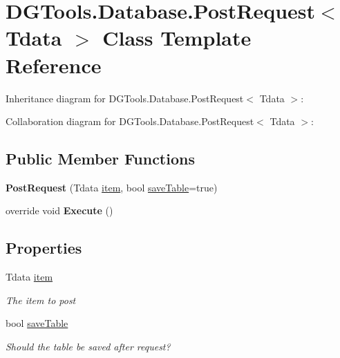 \hypertarget{class_d_g_tools_1_1_database_1_1_post_request}{}\section{D\+G\+Tools.\+Database.\+Post\+Request$<$ Tdata $>$ Class Template Reference}
\label{class_d_g_tools_1_1_database_1_1_post_request}


Inheritance diagram for D\+G\+Tools.\+Database.\+Post\+Request$<$ Tdata $>$\+:


Collaboration diagram for D\+G\+Tools.\+Database.\+Post\+Request$<$ Tdata $>$\+:
\subsection*{Public Member Functions}
\begin{DoxyCompactItemize}
\item 
\mbox{\label{class_d_g_tools_1_1_database_1_1_post_request_a7f39ebff96457a82925095d55cb037fe}} 
{\bfseries Post\+Request} (Tdata \mbox{\hyperlink{class_d_g_tools_1_1_database_1_1_post_request_a448a29ab2dfd1c7782a20dfb7a176ba0}{item}}, bool \mbox{\hyperlink{class_d_g_tools_1_1_database_1_1_post_request_a3e1f964184fd236c45e10e141f14d3e1}{save\+Table}}=true)
\item 
\mbox{\label{class_d_g_tools_1_1_database_1_1_post_request_add637337a86546344a9021c8ea50a8ff}} 
override void {\bfseries Execute} ()
\end{DoxyCompactItemize}
\subsection*{Properties}
\begin{DoxyCompactItemize}
\item 
Tdata \mbox{\hyperlink{class_d_g_tools_1_1_database_1_1_post_request_a448a29ab2dfd1c7782a20dfb7a176ba0}{item}}
\begin{DoxyCompactList}\small\item\em The item to post \end{DoxyCompactList}\item 
bool \mbox{\hyperlink{class_d_g_tools_1_1_database_1_1_post_request_a3e1f964184fd236c45e10e141f14d3e1}{save\+Table}}
\begin{DoxyCompactList}\small\item\em Should the table be saved after request? \end{DoxyCompactList}\end{DoxyCompactItemize}


